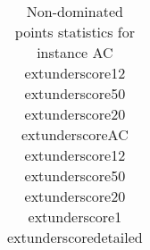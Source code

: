 \begin{table}
\caption{Non-dominated points statistics for instance AC	extunderscore12	extunderscore50	extunderscore20	extunderscoreAC	extunderscore12	extunderscore50	extunderscore20	extunderscore1	extunderscoredetailed}
\label{tab:stats/AC_12_50_20_AC_12_50_20_1_detailed}
\begin{tabular}{}
\toprule
\midrule
\bottomrule
\end{tabular}
\end{table}
